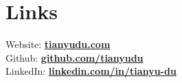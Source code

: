 \documentclass[letterpaper]{deedy-resume} %
\begin{document}
\begin{minipage}[t]{0.33\textwidth} %


%
%
%
%

\sectionspace %


%
%


\section{Links} 
Website: \href{www.tianyudu.com}{\bf tianyudu.com} \\
Github: \href{https://github.com/tianyudu}{\bf github.com/tianyudu} \\
LinkedIn:
\href{https://www.linkedin.com/in/tianyu-du}{\bf linkedin.com/in/tianyu-du} \\


\end{minipage}
\end{document}
